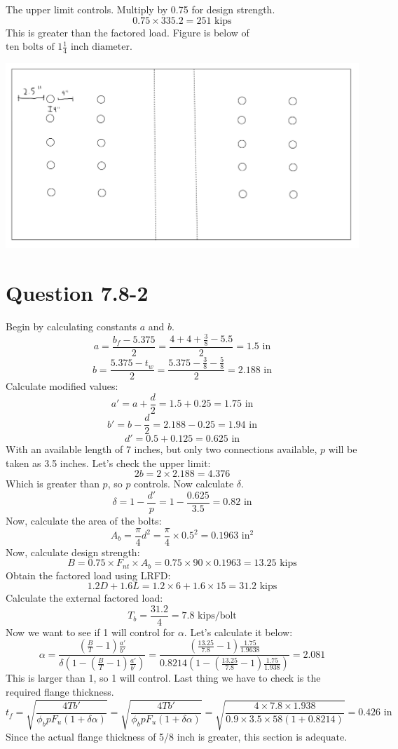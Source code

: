 \documentclass{article}
\begin{document}
The upper limit controls. Multiply by 0.75 for design strength.
\[0.75\times 335.2=251\text{ kips}\]  
This is greater than the factored load. Figure is below of $\boxed{\text{ten bolts of }1\frac{1}{4}\text{ inch diameter}}$.
\begin{center}
    \includegraphics*[scale=0.4]{fig1.png}
\end{center}
\section*{Question 7.8-2} 
Begin by calculating constants $a$ and $b$. 
\[a=\frac{b_f-5.375}{2}=\frac{4+4+\frac{3}{8}-5.5}{2}=1.5\text{ in}\] 
\[b=\frac{5.375-t_w}{2}=\frac{5.375-\frac{3}{8}-\frac{5}{8}}{2}=2.188\text{ in}\] 
Calculate modified values: 
\[a'=a+\frac{d}{2}=1.5+0.25=1.75\text{ in}\] 
\[b'=b-\frac{d}{2}=2.188-0.25=1.94\text{ in}\] 
\[d'=0.5+0.125=0.625\text{ in}\]  
With an available length of 7 inches, but only two connections available, $p$ will be taken as 3.5 inches. Let's check the upper limit: 
\[2b=2\times 2.188=4.376\] 
Which is greater than $p$, so $p$ controls. Now calculate $\delta$. 
\[\delta=1-\frac{d'}{p}=1-\frac{0.625}{3.5}=0.82\text{ in}\]
Now, calculate the area of the bolts: 
\[A_b=\frac{\pi}{4}d^2=\frac{\pi}{4}\times 0.5^2=0.1963\text{ in}^2\] 
Now, calculate design strength: 
\[B=0.75\times F_{nt}\times A_b=0.75\times 90\times 0.1963=13.25\text{ kips}\] 
Obtain the factored load using LRFD: 
\[1.2D+1.6L=1.2\times 6+1.6\times 15=31.2\text{ kips}\] 
Calculate the external factored load: 
\[T_b=\frac{31.2}{4}=7.8\text{ kips/bolt}\]
Now we want to see if 1 will control for $\alpha$. Let's calculate it below: 
\[\alpha= \frac{\left(\frac{B}{T}-1\right)\frac{a'}{b'}}{\delta\left(1-\left(\frac{B}{T}-1\right)\frac{a'}{b'}\right)}=\frac{\left(\frac{13.25}{7.8}-1\right)\frac{1.75}{1.9638}}{0.8214\left(1-\left(\frac{13.25}{7.8}-1\right)\frac{1.75}{1.938}\right)}=2.081\]  
This is larger than 1, so 1 will control. Last thing we have to check is the required flange thickness. 
\[t_f=\sqrt{\frac{4Tb'}{\phi_bpF_u(1+\delta\alpha)}}=\sqrt{\frac{4Tb'}{\phi_bpF_u(1+\delta\alpha)}}=\sqrt{\frac{4\times 7.8\times 1.938}{0.9\times 3.5\times 58(1+0.8214)}}=0.426\text{ in}\]
Since the actual flange thickness of 5/8 inch is greater, this section is $\boxed{\text{adequate}}$.
\end{document}
